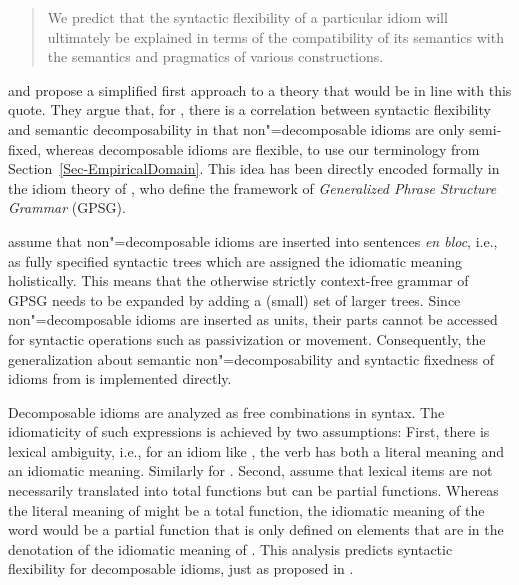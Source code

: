 \documentclass[output=paper
 	        ,biblatex
                ,babelshorthands
                ,newtxmath
                ,draftmode
                ,colorlinks, citecolor=brown
]{langscibook}
\begin{document}
\begin{quote}
We predict that the syntactic flexibility of a particular idiom will ultimately be explained in terms of the compatibility of its semantics with the semantics and pragmatics of various constructions.
\citep[]{NSW94a}\label{NSW-quote}
\end{quote}



\citet{WSN84a-u} and \citet{NSW94a} propose a simplified first approach to a theory that would be in line with this quote. They argue that, for , there is a correlation between syntactic flexibility and semantic decomposability in that non"=decomposable idioms are only semi-fixed, whereas decomposable idioms are flexible, to use our terminology from Section~\ref{Sec-EmpiricalDomain}. 
This idea has been directly encoded formally in the idiom theory of
\citet*[Chapter~7]{GKPS85a}, who define the framework of 
\emph{Generalized Phrase Structure Grammar} (GPSG).

\citet{GKPS85a} assume that  non"=decomposable idioms are inserted into sentences \emph{en bloc}, i.e., as fully specified syntactic trees which are assigned the idiomatic meaning holistically. This means that the otherwise strictly context-free grammar of GPSG needs to be expanded by adding a (small) set of larger trees. 
Since non"=decomposable idioms are inserted as units, their parts cannot be accessed for syntactic operations such as passivization or movement. Consequently, the generalization about semantic non"=decomposability and syntactic fixedness of  idioms from \citet{WSN84a-u} is implemented directly.

Decomposable idioms are analyzed as free combinations in syntax. The idiomaticity of such expressions is achieved by two assumptions: First, there is lexical ambiguity, i.e., for an idiom like , the verb  has both a literal meaning and an idiomatic meaning. Similarly for .
Second, \citet{GKPS85a} assume that lexical items are not necessarily translated into total functions but can be partial functions. Whereas the literal meaning of  might be a total function, the idiomatic meaning of the word would be a partial function that is only defined on elements that are in the denotation of the idiomatic meaning of . This analysis predicts syntactic flexibility for decomposable idioms, just as proposed in \citet{WSN84a-u}.
\end{document}
